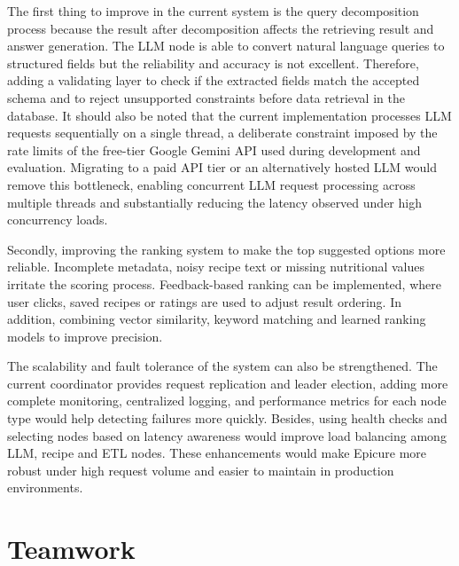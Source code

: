 \documentclass[conference]{IEEEtran}
\begin{document}
The first thing to improve in the current system is the query decomposition process because the result after decomposition affects the retrieving result and answer generation. The LLM node is able to convert natural language queries to structured fields but the reliability and accuracy is not excellent. Therefore, adding a validating layer to check if the extracted fields match the accepted schema and to reject unsupported constraints before data retrieval in the database.  It should also be noted that the current implementation processes LLM requests sequentially on a single thread, a deliberate constraint imposed by the rate limits of the free-tier Google Gemini API used during development and evaluation. Migrating to a paid API tier or an alternatively hosted LLM would remove this bottleneck, enabling concurrent LLM request processing across multiple threads and substantially reducing the latency observed under high concurrency loads.

Secondly, improving the ranking system to make the top suggested options more reliable. Incomplete metadata, noisy recipe text or missing nutritional values irritate the scoring process.
Feedback-based ranking can be implemented, where user clicks, saved recipes or ratings are used to adjust result ordering. In addition, combining vector similarity, keyword matching and learned ranking models to improve precision.

The scalability and fault tolerance of the system can also be strengthened. The current coordinator provides request replication and leader election, adding more complete monitoring, centralized logging, and performance metrics for each node type would help detecting failures more quickly. Besides, using health checks and selecting nodes based on latency awareness would improve load balancing among LLM, recipe and ETL nodes. These enhancements would make Epicure more robust under high request volume and easier to maintain in production environments.

\section{Teamwork}
\label{sec:teamwork}
\end{document}
